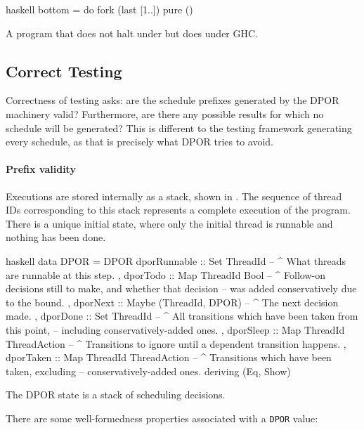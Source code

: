 \begin{listing}
\centering
\begin{cminted}{haskell}
bottom = do
  fork (last [1..])
  pure ()
\end{cminted}
\caption{A program that does not halt under \dejafu{} but does under GHC.}\label{lst:bottom}
\end{listing}

\subsection{Correct Testing}

Correctness of testing asks: are the schedule prefixes generated by
the DPOR machinery valid?  Furthermore, are there any possible results
for which no schedule will be generated?  This is different to the
testing framework generating every schedule, as that is precisely what
DPOR tries to avoid.

\paragraph{Prefix validity}
Executions are stored internally as a stack, shown in .
The sequence of thread IDs corresponding to this stack represents a
complete execution of the program.  There is a unique initial state,
where only the initial thread is runnable and nothing has been done.

\begin{listing}
\centering
\begin{cminted}{haskell}
data DPOR = DPOR
  { dporRunnable :: Set ThreadId
  -- ^ What threads are runnable at this step.
  , dporTodo     :: Map ThreadId Bool
  -- ^ Follow-on decisions still to make, and whether that decision
  -- was added conservatively due to the bound.
  , dporNext     :: Maybe (ThreadId, DPOR)
  -- ^ The next decision made.
  , dporDone     :: Set ThreadId
  -- ^ All transitions which have been taken from this point,
  -- including conservatively-added ones.
  , dporSleep    :: Map ThreadId ThreadAction
  -- ^ Transitions to ignore until a dependent transition happens.
  , dporTaken    :: Map ThreadId ThreadAction
  -- ^ Transitions which have been taken, excluding
  -- conservatively-added ones.
  } deriving (Eq, Show)
\end{cminted}
\caption{The DPOR state is a stack of scheduling decisions.}\label{lst:dpor}
\end{listing}

There are some well-formedness properties associated with a
\verb|DPOR| value:

